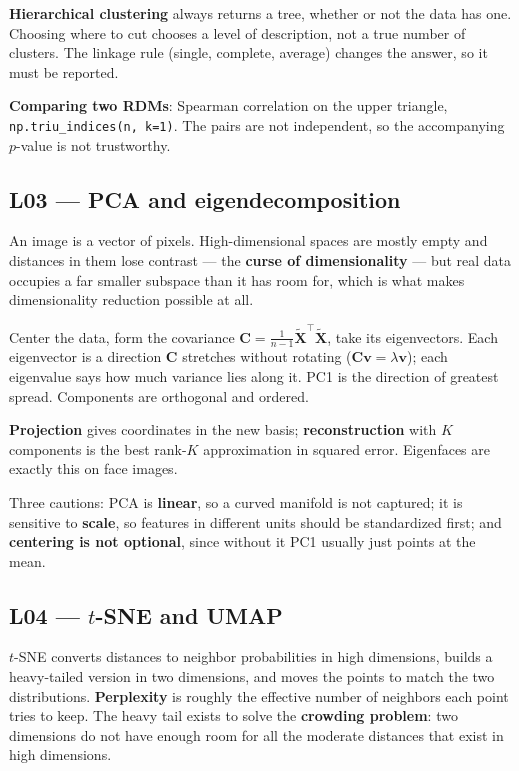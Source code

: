 \documentclass[11pt]{article}
\begin{document}
\textbf{Hierarchical clustering} always returns a tree, whether or not the data
has one. Choosing where to cut chooses a level of description, not a true
number of clusters. The linkage rule (single, complete, average) changes the
answer, so it must be reported.

\textbf{Comparing two RDMs}: Spearman correlation on the upper triangle,
\texttt{np.triu\_indices(n, k=1)}. The pairs are not independent, so the
accompanying $p$-value is not trustworthy.

\subsection{L03 --- PCA and eigendecomposition}

An image is a vector of pixels. High-dimensional spaces are mostly empty and
distances in them lose contrast --- the \textbf{curse of dimensionality} --- but
real data occupies a far smaller subspace than it has room for, which is what
makes dimensionality reduction possible at all.

Center the data, form the covariance $\boldsymbol{C} =
\tfrac{1}{n-1}\tilde{\boldsymbol{X}}^{\!\top}\tilde{\boldsymbol{X}}$, take its
eigenvectors. Each eigenvector is a direction $\boldsymbol{C}$ stretches without
rotating ($\boldsymbol{C}\boldsymbol{v} = \lambda\boldsymbol{v}$); each
eigenvalue says how much variance lies along it. PC1 is the direction of
greatest spread. Components are orthogonal and ordered.

\textbf{Projection} gives coordinates in the new basis;
\textbf{reconstruction} with $K$ components is the best rank-$K$ approximation
in squared error. Eigenfaces are exactly this on face images.

Three cautions: PCA is \textbf{linear}, so a curved manifold is not captured;
it is sensitive to \textbf{scale}, so features in different units should be
standardized first; and \textbf{centering is not optional}, since without it PC1
usually just points at the mean.

\subsection{L04 --- $t$-SNE and UMAP}

$t$-SNE converts distances to neighbor probabilities in high dimensions,
builds a heavy-tailed version in two dimensions, and moves the points to match
the two distributions. \textbf{Perplexity} is roughly the effective number of
neighbors each point tries to keep. The heavy tail exists to solve the
\textbf{crowding problem}: two dimensions do not have enough room for all the
moderate distances that exist in high dimensions.
\end{document}
